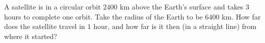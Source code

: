 A satellite is in a circular orbit $2400$ km above the Earth's surface and takes $3$ hours to complete one orbit. Take the radius of the Earth to be $6400$ km. How far does the satellite travel in $1$ hour, and how far is it then (in a straight line) from where it started?
